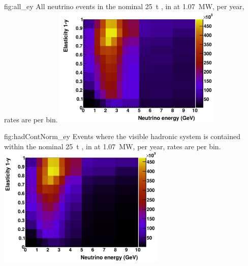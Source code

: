 \begin{dunefigure}{fig:all_ey}
{All neutrino events in the nominal \SI{25}{\tonne} , in  at \SI{1.07}{\mega\watt}, per year, rates are per bin.}
	\includegraphics[width=0.6\textwidth]{graphics/all_ey.png}
\end{dunefigure}

\begin{dunefigure}{fig:hadContNorm_ey}
{Events where the visible hadronic system is contained within the nominal \SI{25}{\tonne} , in  at \SI{1.07}{\mega\watt}, per year, rates are per bin.}
	\includegraphics[width=0.6\textwidth]{graphics/hadContNorm_ey.png}
\end{dunefigure}

